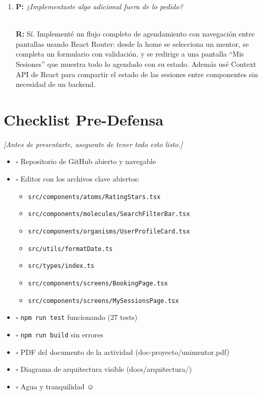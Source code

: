 \documentclass[12pt, a4paper]{article}
\newcommand{\nota}[1]{%
  \textcolor{upds-gold}{\small\textit{[#1]}}%
}
\newcommand{\pregunta}[1]{%
  \textbf{\textcolor{upds-blue}{P:}} \textit{#1}%
}
\newcommand{\respuesta}[1]{%
  \\[2pt]\textbf{\textcolor{upds-blue}{R:}} #1%
}
\begin{document}
\begin{enumerate}
  \item \pregunta{¿Implementaste algo adicional fuera de lo pedido?}
  \respuesta{Sí. Implementé un flujo completo de agendamiento con navegación entre pantallas usando React Router: desde la home se selecciona un mentor, se completa un formulario con validación, y se redirige a una pantalla ``Mis Sesiones'' que muestra todo lo agendado con su estado. Además usé Context API de React para compartir el estado de las sesiones entre componentes sin necesidad de un backend.}

\end{enumerate}

\section{Checklist Pre-Defensa}
\nota{Antes de presentarte, asegurate de tener todo esto listo.}

\begin{itemize}
  \item $\square$ Repositorio de GitHub abierto y navegable
  \item $\square$ Editor con los archivos clave abiertos:
  \begin{itemize}
    \item \texttt{src/components/atoms/RatingStars.tsx}
    \item \texttt{src/components/molecules/SearchFilterBar.tsx}
    \item \texttt{src/components/organisms/UserProfileCard.tsx}
    \item \texttt{src/utils/formatDate.ts}
    \item \texttt{src/types/index.ts}
    \item \texttt{src/components/screens/BookingPage.tsx}
    \item \texttt{src/components/screens/MySessionsPage.tsx}
  \end{itemize}
  \item $\square$ \texttt{npm run test} funcionando (27 tests)
  \item $\square$ \texttt{npm run build} sin errores
  \item $\square$ PDF del documento de la actividad (doc-proyecto/unimentor.pdf)
  \item $\square$ Diagrama de arquitectura visible (docs/arquitectura/)
  \item $\square$ Agua y tranquilidad $\smiley$
\end{itemize}
\end{document}
